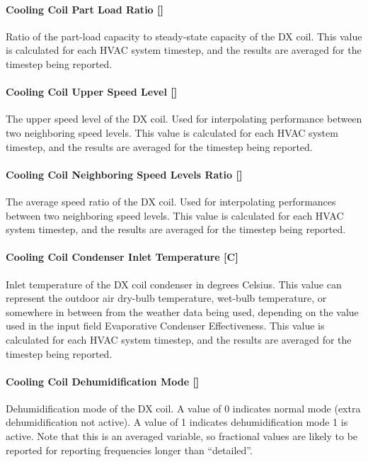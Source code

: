 \paragraph{Cooling Coil Part Load Ratio {[]}}

Ratio of the part-load capacity to steady-state capacity of the DX coil. This value is calculated for each HVAC system timestep, and the results are averaged for the timestep being reported.

\paragraph{Cooling Coil Upper Speed Level {[]}}

The upper speed level of the DX coil. Used for interpolating performance between two neighboring speed levels. This value is calculated for each HVAC system timestep, and the results are averaged for the timestep being reported.

\paragraph{Cooling Coil Neighboring Speed Levels Ratio {[]}}

The average speed ratio of the DX coil. Used for interpolating performances between two neighboring speed levels. This value is calculated for each HVAC system timestep, and the results are averaged for the timestep being reported.

\paragraph{Cooling Coil Condenser Inlet Temperature {[C]}}

Inlet temperature of the DX coil condenser in degrees Celsius. This value can represent the outdoor air dry-bulb temperature, wet-bulb temperature, or somewhere in between from the weather data being used, depending on the value used in the input field Evaporative Condenser Effectiveness. This value is calculated for each HVAC system timestep, and the results are averaged for the timestep being reported.

\paragraph{Cooling Coil Dehumidification Mode {[]}}

Dehumidification mode of the DX coil. A value of 0 indicates normal mode (extra dehumidification not active). A value of 1 indicates dehumidification mode 1 is active. Note that this is an averaged variable, so fractional values are likely to be reported for reporting frequencies longer than “detailed”.

